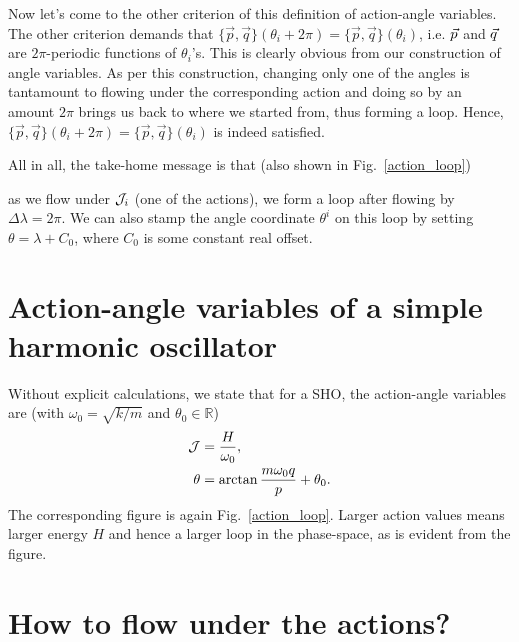 \hfill \break



Now let's come to the other criterion of this definition of action-angle variables.
The other criterion demands that 
{$\{ \vec{p}, \vec{q} \}(\theta_i + 2 \pi)  = \{ \vec{p}, \vec{q} \}(\theta_i ) $},
i.e. $\vec{p}$ and $\vec{q}$ are $2 \pi$-periodic
functions of $\theta_i$'s. This is clearly obvious from our construction of angle 
variables. As per this construction, changing only one of the angles
is tantamount to flowing under the corresponding action and doing so by an
amount $2 \pi$ brings us back to where we started from, thus forming  a loop. 
Hence, {$\{ \vec{p}, \vec{q} \}(\theta_i + 2 \pi)  = \{ \vec{p}, \vec{q} \}(\theta_i ) $} is indeed satisfied.





All in all, the take-home message is that (also shown in Fig.~\ref{action_loop})\\
\begin{tcolorbox}
as we flow under $\mathcal{J}_i$ (one of the actions), we form a loop after flowing by $\Delta \lambda = 2 \pi$.
We can also stamp the angle coordinate $\theta^i$ on this loop by setting $\theta = \lambda + C_0$, where 
$C_0$ is some constant real offset.
\end{tcolorbox}




\section{Action-angle variables of a simple harmonic oscillator}


Without explicit calculations, we state that for a SHO, the action-angle
variables are (with $\omega_0 =  \sqrt{k/m}$ and $\theta_0 \in \mathbb{R}$)
\begin{align}
\mathcal{J}  &= \frac{H}{\omega_0}  ,   \\
\theta    & = \arctan \frac{m \omega_0 q}{p} + \theta_0  .
\end{align}
The corresponding figure is again Fig.~\ref{action_loop}. Larger action
values means larger energy $H$ and hence a larger loop in the phase-space,
as is evident from the figure.





\section{How to flow under the actions?}






